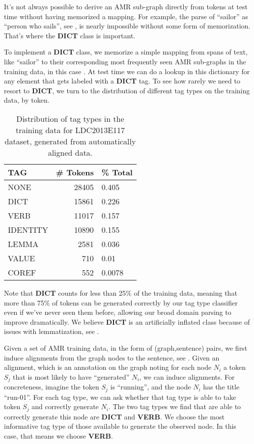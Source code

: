 \documentclass[11pt]{article}
\begin{document}

It's not always possible to derive an AMR sub-graph directly from tokens at test time without having memorized a mapping. For example, the parse of ``sailor'' as ``person who sails'', see , is nearly impossible without some form of memorization. That's where the \textbf{DICT} class is important.

To implement a \textbf{DICT} class, we memorize a simple mapping from spans of text, like ``sailor'' to their corresponding most frequently seen AMR sub-graphs in the training data, in this case . At test time we can do a lookup in this dictionary for any element that gets labeled with a \textbf{DICT} tag. To see how rarely we need to resort to \textbf{DICT}, we turn to the distribution of different tag types on the training data, by token.

\begin{table}[h]
\begin{center}
\begin{tabular}{|l|rl|}
\hline \bf TAG & \bf \# Tokens & \bf \% Total \\ \hline
NONE & 28405 & 0.405\\
DICT & 15861 & 0.226 \\
VERB & 11017 & 0.157 \\
IDENTITY & 10890 & 0.155 \\
LEMMA & 2581 & 0.036 \\
VALUE & 710  & 0.01\\
COREF & 552 & 0.0078 \\
\hline
\end{tabular}
\end{center}
\caption{\label{font-table} Distribution of tag types in the training data for LDC2013E117 dataset, generated from automatically aligned data. }
\end{table}

Note that \textbf{DICT} counts for less than 25\% of the training data, meaning that more than 75\% of tokens can be generated correctly by our tag type classifier even if we've never seen them before, allowing our broad domain parsing to improve dramatically. We believe \textbf{DICT} is an artificially inflated class because of issues with lemmatization, see .


Given a set of AMR training data, in the form of (graph,sentence) pairs, we first induce alignments from the graph nodes to the sentence, see . Given an alignment, which is an annotation on the graph noting for each node $N_i$ a token $S_j$ that is most likely to have ``generated'' $N_i$, we can induce alignments. For concreteness, imagine the token $S_j$ is ``running'', and the node $N_i$ has the title ``run-01''. For each tag type, we can ask whether that tag type is able to take token $S_j$ and correctly generate $N_i$. The two tag types we find that are able to correctly generate this node are \textbf{DICT} and \textbf{VERB}. We choose the most informative tag type of those available to generate the observed node. In this case, that means we choose \textbf{VERB}.
\end{document}
